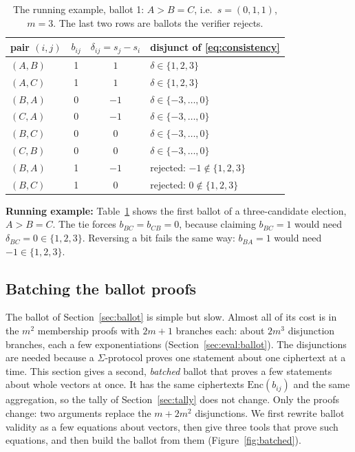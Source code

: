 \begin{table}[t]
  \caption{The running example, ballot 1: $A > B = C$, i.e.\ $s = (0,1,1)$,
  $m = 3$. The last two rows are ballots the verifier rejects.}
  \label{tab:example-ballot}
  \centering\footnotesize
  \begin{tabular}{@{}lccl@{}}
    \toprule
    pair $(i,j)$ & $b_{ij}$ & $\delta_{ij} = s_j - s_i$ & disjunct of \eqref{eq:consistency} \\
    \midrule
    $(A,B)$ & 1 & $1$  & $\delta \in \{1,2,3\}$ \\
    $(A,C)$ & 1 & $1$  & $\delta \in \{1,2,3\}$ \\
    $(B,A)$ & 0 & $-1$ & $\delta \in \{-3,\ldots,0\}$ \\
    $(C,A)$ & 0 & $-1$ & $\delta \in \{-3,\ldots,0\}$ \\
    $(B,C)$ & 0 & $0$  & $\delta \in \{-3,\ldots,0\}$ \\
    $(C,B)$ & 0 & $0$  & $\delta \in \{-3,\ldots,0\}$ \\
    \midrule
    $(B,A)$ & 1 & $-1$ & rejected: $-1 \notin \{1,2,3\}$ \\
    $(B,C)$ & 1 & $0$  & rejected: $0 \notin \{1,2,3\}$ \\
    \bottomrule
  \end{tabular}
\end{table}

\textbf{Running example:} Table~\ref{tab:example-ballot} shows the first ballot of a three-candidate
election, $A > B = C$. The tie forces $b_{BC} = b_{CB} = 0$, because
claiming $b_{BC} = 1$ would need $\delta_{BC} = 0 \in \{1,2,3\}$.
Reversing a bit fails the same way: $b_{BA} = 1$ would need $-1 \in
\{1,2,3\}$.

\subsection{Batching the ballot proofs}\label{sec:batched}
The ballot of Section~\ref{sec:ballot} is simple but slow. Almost all of
its cost is in the $m^2$ membership proofs with $2m+1$ branches each:
about $2m^3$ disjunction branches, each a few exponentiations
(Section~\ref{sec:eval:ballot}). The disjunctions are needed because a
$\Sigma$-protocol proves one statement about one ciphertext at a time.
This section gives a second, \emph{batched} ballot that proves a few
statements about whole vectors at once. It has the same ciphertexts
$\mathrm{Enc}(b_{ij})$ and the same aggregation, so the tally of
Section~\ref{sec:tally} does not change. Only the proofs change: two
arguments replace the $m + 2m^2$ disjunctions. We first rewrite ballot
validity as a few equations about vectors, then give three tools that
prove such equations, and then build the ballot from them
(Figure~\ref{fig:batched}).

